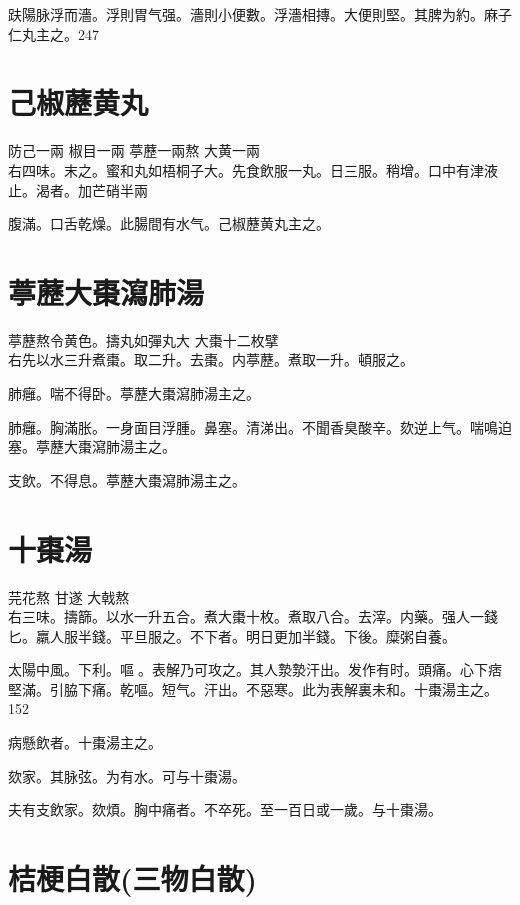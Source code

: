 趺陽脉浮而濇。浮則胃气强。濇則小便數。浮濇相摶。大便則堅。其脾为約。麻子仁丸主之。247

\section{己椒藶黄丸}

防己{\scriptsize 一兩} 椒目{\scriptsize 一兩} 葶藶{\scriptsize 一兩熬} 大黄{\scriptsize 一兩}\\
右四味。末之。蜜和丸如梧桐子大。先食飲服一丸。日三服。稍增。口中有津液止。渴者。加芒硝半兩

腹滿。口舌乾燥。此腸間有水气。己椒藶黄丸主之。

\section{葶藶大棗瀉肺湯}

葶藶{\scriptsize 熬令黄色。擣丸如彈丸大} 大棗{\scriptsize 十二枚擘}\\
右先以水三升煮棗。取二升。去棗。内葶藶。煮取一升。頓服之。

肺癰。喘不得卧。葶藶大棗瀉肺湯主之。

肺癰。胸滿胀。一身面目浮腫。鼻塞。清涕出。不聞香臭酸辛。欬逆上气。喘鳴迫塞。葶藶大棗瀉肺湯主之。

支飲。不得息。葶藶大棗瀉肺湯主之。

\section{十棗湯}

芫花{\scriptsize 熬} 甘遂{ }大戟{\scriptsize 熬}\\
右三味。擣篩。以水一升五合。煮大棗十枚。煮取八合。去滓。内藥。强人一錢匕。羸人服半錢。平旦服之。不下者。明日更加半錢。下後。糜粥自養。

太陽中風。下利。嘔{\sungtpii 𠱘}。表解乃可攻之。其人漐漐汗出。发作有时。頭痛。心下痞堅滿。引脇下痛。乾嘔。短气。汗出。不惡寒。此为表解裏未和。十棗湯主之。152

病懸飲者。十棗湯主之。

欬家。其脉弦。为有水。可与十棗湯。

夫有支飲家。欬煩。胸中痛者。不卒死。至一百日{\khaaitp 或}一歲。与十棗湯。

\section{桔梗白散(三物白散)}


